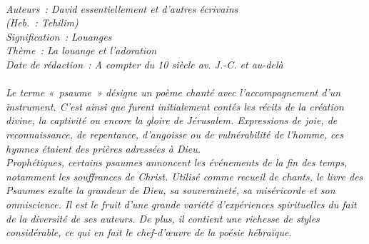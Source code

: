 \BFont
\noindent\hrulefill
{\footnotesize
\textit{
\bigskip
{\centering{}
\\Auteurs~: David essentiellement et d'autres écrivains
\\(Heb.~: Tehilim)
\\Signification~: Louanges 
\\Thème~: La louange et l'adoration
\\Date de rédaction~: A compter du 10 siècle av. J.-C. et au-delà\\}
}
\textit{
\\Le terme «~psaume~» désigne un poème chanté avec l'accompagnement d'un instrument. C'est ainsi que furent initialement contés les récits de la création divine, la captivité ou encore la gloire de Jérusalem. Expressions de joie, de reconnaissance, de repentance, d'angoisse ou de vulnérabilité de l'homme, ces hymnes étaient des prières adressées à Dieu.
\\Prophétiques, certains psaumes annoncent les événements de la fin des temps, notamment les souffrances de Christ. Utilisé comme recueil de chants, le livre des Psaumes exalte la grandeur de Dieu, sa souveraineté, sa miséricorde et son omniscience. Il est le fruit d'une grande variété d'expériences spirituelles du fait de la diversité de ses auteurs. De plus, il contient une richesse de styles considérable, ce qui en fait le chef-d'œuvre de la poésie hébraïque.\bigskip
}
}
\par\nobreak\noindent\hrulefill
